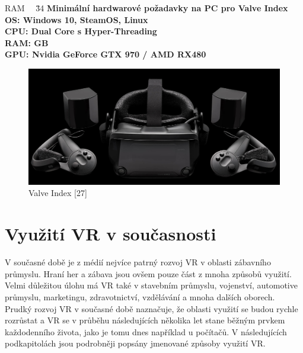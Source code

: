 \documentclass[a4paper, 12pt]{report}
\begin{document}
\begin{tabbing}
    RAM ~~\= 
    \= 34 \kill
    \bfseries Minimální hardwarové požadavky na PC pro Valve Index \> \\[1mm]
    OS: \> Windows 10, SteamOS, Linux\\
    CPU: \> Dual Core s Hyper-Threading\\
    RAM:  GB\\
    GPU: \> Nvidia GeForce GTX 970 / AMD RX480\\
\end{tabbing} 

\begin{figure}[h!]
	\centering
	\includegraphics[width=16cm]{valve.jpg}
	\caption{Valve Index [27]}
\end{figure}

\section{Využití VR v současnosti}
V současné době je z médií nejvíce patrný rozvoj VR v oblasti zábavního průmyslu. Hraní her a zábava jsou ovšem pouze část z mnoha způsobů využití. Velmi důležitou úlohu má VR také v stavebním průmyslu, vojenství, automotive průmyslu, marketingu, zdravotnictví, vzdělávání a mnoha dalších oborech. Prudký rozvoj VR v současné době naznačuje, že oblasti využití se budou rychle rozrůstat a VR se v průběhu následujících několika let stane běžným prvkem každodenního života, jako je tomu dnes například u počítačů. V následujících podkapitolách jsou podrobněji popsány jmenované způsoby využití VR.
\end{document}
